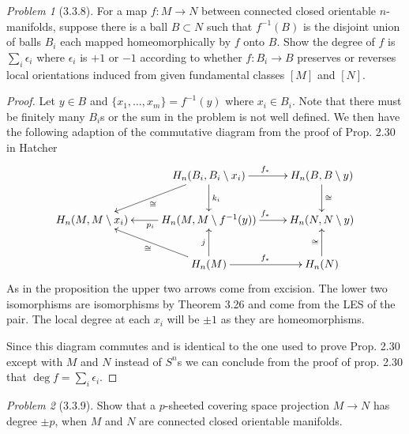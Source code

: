 \documentclass[10pt]{article}
\newcommand{\sk}{\vskip 10mm}
\theoremstyle{remark}
\newtheorem{problem}{Problem}
\begin{document}
\begin{problem}[3.3.8]
  For a map $f:M\rightarrow N$ between connected closed orientable
  $n$-manifolds, suppose there is a ball $B\subset N$ such that $f^{-1}(B)$ is
  the disjoint union of balls $B_i$ each mapped homeomorphically by $f$ onto
  $B$. Show the degree of $f$ is $\sum_i\epsilon_i$ where $\epsilon_i$ is
  $+1$ or $-1$ according to whether $f:B_i\rightarrow B$ preserves or reverses
  local orientations induced from given fundamental classes $[M]$ and $[N]$.
\end{problem}

\begin{proof}
  Let $y\in B$ and $\{x_1,\ldots,x_m\}=f^{-1}(y)$ where $x_i\in B_i$. Note that there must
  be finitely many $B_i$s or the sum in the problem is not well defined. We then
  have the following adaption of the commutative diagram from the proof of Prop. 2.30 in Hatcher
  \[
    \xymatrix{
      & H_n(B_i,B_i\setminus x_i) \ar[r]^{f_*} \ar[dl]^\cong \ar[d]^{k_i}& H_n(B,B\setminus y) \ar[d]^{\cong}\\
      H_n(M,M\setminus x_i) & H_n(M,M\setminus f^{-1}(y)) \ar[l]^{p_i} \ar[r]^{f_*} & H_n(N,N\setminus y)\\
      & H_n(M) \ar[ul]^{\cong} \ar[u]^j \ar[r]^{f_*} & H_n(N) \ar[u]^\cong \\
    }
  \]
  As in the proposition the upper two arrows come from excision. The lower
  two isomorphisms are isomorphisms by Theorem 3.26 and come from the LES of the
  pair. The local degree at each $x_i$ will be $\pm 1$ as they are homeomorphisms.

  Since this diagram commutes and is identical to the one used to prove Prop. 2.30
  except with $M$ and $N$ instead of $S^n$s we can conclude from the proof of prop. 2.30
  that $\deg f= \sum_i \epsilon_i$.
\end{proof}

\sk

\begin{problem}[3.3.9]
  Show that a $p$-sheeted covering space projection $M\rightarrow N$ has
  degree $\pm p$, when $M$ and $N$ are connected closed orientable manifolds.
\end{problem}
\end{document}

